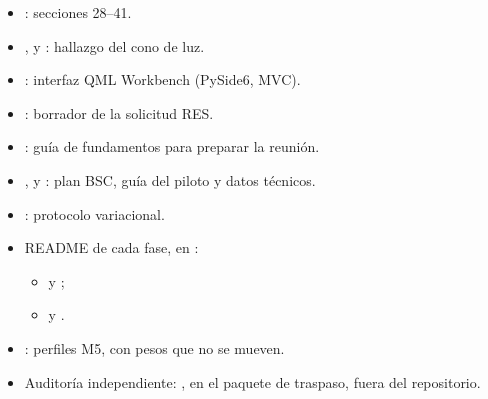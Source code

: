 \documentclass[11pt,a4paper]{article}
\begin{document}
\begin{itemize}
  \item {}: secciones 28--41.
  \item {},  y : hallazgo del cono de luz.
  \item {}: interfaz QML Workbench (PySide6, MVC).
  \item {}: borrador de la solicitud RES.
  \item {}: guía de fundamentos para preparar la reunión.
  \item {},  y : plan BSC, guía del piloto y datos técnicos.
  \item {}: protocolo variacional.
  \item README de cada fase, en :
  \begin{itemize}
    \item {} y ;
    \item {} y .
  \end{itemize}
  \item {}: perfiles M5, con pesos que no se mueven.
  \item Auditoría independiente: , en el paquete de traspaso, fuera del repositorio.
\end{itemize}
\end{document}
